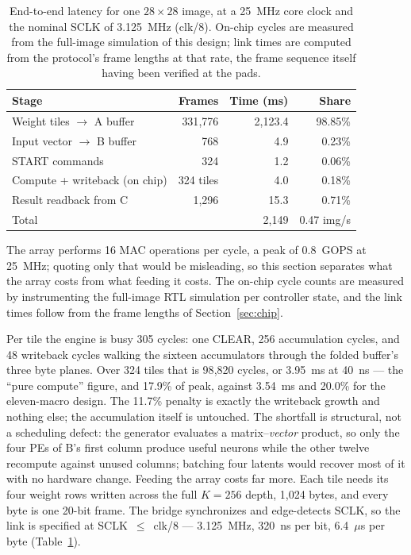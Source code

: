 \documentclass[conference,a4paper]{APSIPA2026}
\begin{document}
\begin{table}[!ht]
\caption{End-to-end latency for one $28\times28$ image, at a 25~MHz core clock and the nominal SCLK of 3.125~MHz (clk/8). On-chip cycles are measured from the full-image simulation of this design; link times are computed from the protocol's frame lengths at that rate, the frame sequence itself having been verified at the pads.}
\label{tab:latency}
\centering
\renewcommand{\arraystretch}{1.08}
\begin{tabular}{@{}lrrr@{}}
\toprule
Stage & Frames & Time (ms) & Share \\
\midrule
Weight tiles $\rightarrow$ A buffer & 331{,}776 & 2{,}123.4 & 98.85\% \\
Input vector $\rightarrow$ B buffer & 768       & 4.9       & 0.23\% \\
START commands                      & 324       & 1.2       & 0.06\% \\
Compute + writeback (on chip)       & 324 tiles & 4.0       & 0.18\% \\
Result readback from C              & 1{,}296   & 15.3      & 0.71\% \\
\midrule
Total                               &           & 2{,}149   & 0.47 img/s \\
\bottomrule
\end{tabular}
\end{table}
The array performs 16 MAC operations per cycle, a peak of 0.8~GOPS at 25~MHz; quoting only that would be misleading, so this section separates what the array costs from what feeding it costs. The on-chip cycle counts are measured by instrumenting the full-image RTL simulation per controller state, and the link times follow from the frame lengths of Section~\ref{sec:chip}.

Per tile the engine is busy 305 cycles: one CLEAR, 256 accumulation cycles, and 48 writeback cycles walking the sixteen accumulators through the folded buffer's three byte planes. Over 324 tiles that is 98{,}820 cycles, or 3.95~ms at 40~ns --- the ``pure compute'' figure, and 17.9\% of peak, against 3.54~ms and 20.0\% for the eleven-macro design. The 11.7\% penalty is exactly the writeback growth and nothing else; the accumulation itself is untouched. The shortfall is structural, not a scheduling defect: the generator evaluates a matrix--\emph{vector} product, so only the four PEs of B's first column produce useful neurons while the other twelve recompute against unused columns; batching four latents would recover most of it with no hardware change. Feeding the array costs far more. Each tile needs its four weight rows written across the full $K=256$ depth, 1{,}024 bytes, and every byte is one 20-bit frame. The bridge synchronizes and edge-detects SCLK, so the link is specified at SCLK~$\leq$~clk/8 --- 3.125~MHz, 320~ns per bit, 6.4~$\mu$s per byte (Table~\ref{tab:latency}).
\end{document}
